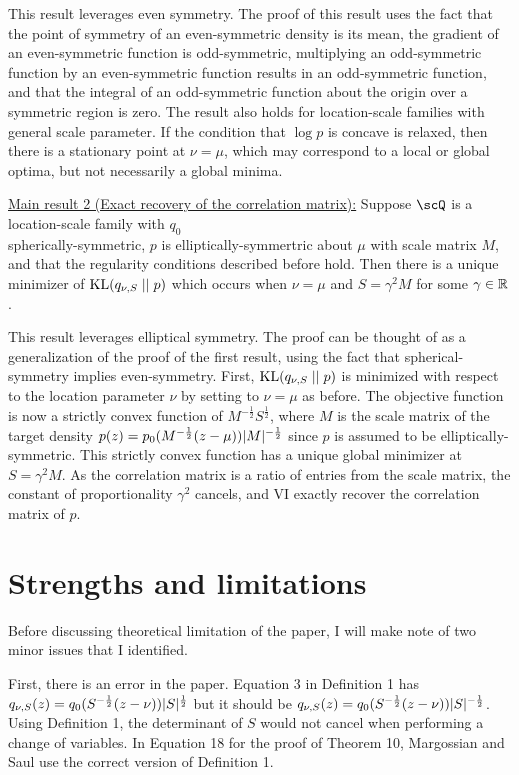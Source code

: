 \documentclass{article}
\begin{document}
This result leverages even symmetry.
The proof of this result uses the fact that the point of symmetry of an even-symmetric density is its mean,
the gradient of an even-symmetric function is odd-symmetric,
multiplying an odd-symmetric function by an even-symmetric function results in an odd-symmetric function,
and that the integral of an odd-symmetric function about the origin over a symmetric region is zero.
The result also holds for location-scale families with general scale parameter.
If the condition that $\log p$ is concave is relaxed, then there is a stationary point at $\nu = \mu$, which may correspond to a local or global optima, but not necessarily a global minima.

\underline{Main result 2 (Exact recovery of the correlation matrix):}
Suppose $\scQ$ is a location-scale family with $q_0$ \\ spherically-symmetric, $p$ is
elliptically-symmertric about $\mu$ with scale matrix $M$, and that the regularity conditions described before hold.
Then there is a unique minimizer of $\operatorname{KL}(q_{\nu, S} \; || \; p)$ which occurs when $\nu = \mu$ and $S = \gamma^2 M$ for some $\gamma \in \mathbb{R}$.


This result leverages elliptical symmetry.
The proof can be thought of as a generalization of the proof of the first result, using the fact that spherical-symmetry implies even-symmetry.
First, $\operatorname{KL}(q_{\nu, S} \; || \; p)$ is minimized with respect to the location parameter $\nu$ by setting to $\nu = \mu$ as before.
The objective function is now a strictly convex function of $M^{-\frac{1}{2}} S^{\frac{1}{2}}$,
where $M$ is the scale matrix of the target density $p(z) = p_0(M^{-\frac{1}{2}}(z - \mu))\lvert M\rvert^{-\frac{1}{2}}$ since $p$ is assumed to be elliptically-symmetric.
This strictly convex function has a unique global minimizer at $S = \gamma^2 M$.
As the correlation matrix is a ratio of entries from the scale matrix, the constant of proportionality $\gamma^2$ cancels, and VI exactly recover the correlation matrix of $p$.





\section{Strengths and limitations}

Before discussing theoretical limitation of the paper, I will make note of two minor issues that I identified.

First, there is an error in the paper. Equation 3 in Definition 1 has $q_{\nu, S}(z) = q_0(S^{-\frac{1}{2}}(z - \nu))\lvert S\rvert^{\frac{1}{2}}$ but it should be $q_{\nu, S}(z) = q_0(S^{-\frac{1}{2}}(z - \nu))\lvert S\rvert^{-\frac{1}{2}}$.
Using Definition 1, the determinant of $S$ would not cancel when performing a change of variables.
In Equation 18 for the proof of Theorem 10, Margossian and Saul use the correct version of Definition 1.
\end{document}
